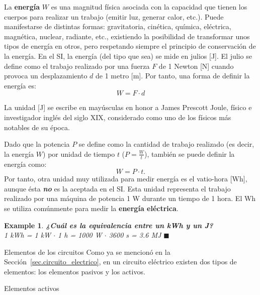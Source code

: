 \documentclass[11pt]{book} %
\makeatletter
\numberwithin{dummy}{section}
\theoremstyle{ocrenumbox}
\theoremstyle{blacknumex}
\newtheorem{exampleT}{Example}[chapter]
\theoremstyle{blacknumbox}
\theoremstyle{ocrenum}
\newenvironment{example}{\begin{exampleT}}{\hfill{\tiny\ensuremath{\blacksquare}}\end{exampleT}}
\newenvironment{remark}{\par\vspace{10pt}\small %
\begin{list}{}{
\leftmargin=35pt %
\rightmargin=25pt}\item\ignorespaces %
\makebox[-2.5pt]{\begin{tikzpicture}[overlay]
\node[draw=ocre!60,line width=1pt,circle,fill=ocre!25,font=\sffamily\bfseries,inner sep=2pt,outer sep=0pt] at (-15pt,0pt){\textcolor{ocre}{N}};\end{tikzpicture}} %
\advance\baselineskip -1pt}{\end{list}\vskip5pt} %
\renewcommand{\section}{\@startsection{section}{1}{\z@}
{-4ex \@plus -1ex \@minus -.4ex}
{1ex \@plus.2ex }
{\normalfont\large\sffamily\bfseries}}
\renewcommand{\subsection}{\@startsection {subsection}{2}{\z@}
{-3ex \@plus -0.1ex \@minus -.4ex}
{0.5ex \@plus.2ex }
{\normalfont\sffamily\bfseries}}
\newlength\esp
\makeatother
\begin{document}
	La \textbf{energía} $W$ es una magnitud física asociada con la capacidad que tienen los cuerpos para realizar un trabajo (emitir luz, generar calor, etc.). Puede manifestarse de distintas formas: gravitatoria, cinética, química, eléctrica, magnética, nuclear, radiante, etc., existiendo la posibilidad de transformar unos tipos de energía en otros, pero respetando siempre el principio de conservación de la energía. En el SI, la energía (del tipo que sea) se mide en julios [J]. El julio se define como el trabajo realizado por una fuerza $F$ de 1 Newton [N] cuando provoca un desplazamiento $d$ de 1 metro [m]. Por tanto, una forma de definir la energía es:
	\begin{equation*}
		W=F\cdot d 
	\end{equation*}
	\begin{remark}
		La unidad [J] se escribe en mayúsculas en honor a James Prescott Joule, físico e investigador inglés del siglo XIX, considerado como uno de los físicos más notables de su época. 
	\end{remark}
	
	Dado que la potencia $P$ se define como la cantidad de trabajo realizado (es decir, la energía $W$) por unidad de tiempo $t$ ($P=\frac{W}{t}$), también se puede definir la energía como:
	\begin{equation*}\label{eq.Ept}
		W=P\cdot t.
	\end{equation*}
	Por tanto, otra unidad muy utilizada para medir energía es el vatio-hora [Wh], aunque ésta \textbf{\emph{no}} es la aceptada en el SI. Esta unidad representa el trabajo realizado por una máquina de potencia 1 W durante un tiempo de 1 hora. El Wh se utiliza comúnmente para medir la \textbf{energía eléctrica}. 
	
	\vspace{4mm}
	\begin{example}
		\textbf{¿Cuál es la equivalencia entre un kWh y un J?}\\
		1 kWh = 1 kW $\cdot$ 1 h = 1000 W $\cdot$ 3600 s = 3.6 MJ 
	\end{example}
	
	\section{Elementos de los circuitos}
	Como ya se mencionó en la Sección~\ref{sec.circuito_electrico}, en un circuito eléctrico existen dos tipos de elementos: los elementos pasivos y los activos.
	
	\subsection{Elementos activos}\label{sec.elementos_activos}
	
\end{document}
